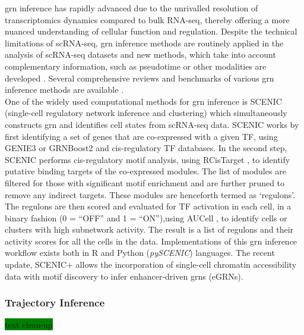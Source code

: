  \gls{grn} inference has rapidly advanced due to the unrivalled resolution of transcriptomics dynamics \textbf{\cite{kim_review_2024}} compared to bulk RNA-seq, thereby offering a more nuanced understanding of cellular function and regulation. Despite the technical limitations of scRNA-seq, \gls{grn} inference methods are routinely applied in the analysis of scRNA-seq datasets and new methods, which take into account complementary information, such as pseudotime or other modalities are developed \textbf{\cite{akers_gene_2021}}. Several comprehensive reviews and benchmarks of various \gls{grn} inference methods are available \textbf{\cite{kim_review_2024,akers_gene_2021,nguyen_comprehensive_2020,pratapa_benchmarking_2020,mccalla_identifying_2023}}.\\


One of the widely used computational methods for \gls{grn} inference is SCENIC (single-cell regulatory network inference and clustering) \textbf{\cite{aibar_scenic_2017,van_de_sande_scalable_2020}} which simultaneously constructs \gls{grn} and identifies cell states from scRNA-seq data. SCENIC works by first identifying a set of genes that are co-expressed with a given TF, using GENIE3 \textbf{\cite{huynh-thu_inferring_2010}} or GRNBoost2 \textbf{\cite{moerman_grnboost2_2019}} and cis-regulatory TF databases. In the second step, SCENIC performs cis-regulatory motif analysis, using RCisTarget \textbf{\cite{aibar_scenic_2017,noauthor_rcistarget_nodate}}, to identify putative binding targets of the co-expressed modules. The list of modules are filtered for those with significant motif enrichment and are further pruned to remove any indirect targets. These modules are henceforth termed as `regulons'. The regulons are then scored and evaluated for TF activation in each cell, in a binary fashion (0 = “OFF” and 1 = “ON”),using AUCell \textbf{\cite{aibar_scenic_2017,noauthor_aucell_nodate}}, to identify cells or clusters with high subnetwork activity. The result is a list of regulons and their activity scores for all the cells in the data. Implementations of this \gls{grn} inference workflow exists both in R and Python (\textit{pySCENIC}) \textbf{\cite{kumar_inference_2021}} languages. The recent update, SCENIC+ \textbf{\cite{bravo_gonzalez-blas_scenic_2023}} allows the incorporation of single-cell chromatin accessibility data with motif discovery to infer enhancer-driven \glspl{grn} (eGRNs).


\subsubsection{Trajectory Inference}
\label{sec:scrna_analysis_grn}
\colorbox{green}{text clean-up}\\

